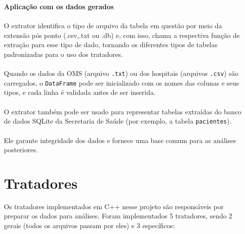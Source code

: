 \documentclass[a4paper,12pt]{article}
\begin{document}
\textbf{Aplicação com os dados gerados}
\\
\\
O extrator identifica o tipo de arquivo da tabela em questão por meio da extensão pós ponto (.csv,.txt ou .db) e, com isso, chama a respectiva função de extração para esse tipo de dado, tornando os diferentes tipos de tabelas padronizadas para o uso dos tratadores.\\
\\
Quando os dados da OMS (arquivo \texttt{.txt}) ou dos hospitais (arquivos \texttt{.csv}) são carregados, o \texttt{DataFrame} pode ser inicializado com os nomes das colunas e seus tipos, e cada linha é validada antes de ser inserida.
\\
\\
O extrator também pode ser usado para representar tabelas extraídas do banco de dados SQLite da Secretaria de Saúde (por exemplo, a tabela \texttt{pacientes}).
\\
\\
Ele garante integridade dos dados e fornece uma base comum para as análises posteriores.


\section{Tratadores}

Os tratadores implementados em C++ nesse projeto são responsáveis por preparar os dados para análises. Foram implementados 5 tratadores, sendo 2 gerais (todos os arquivos passam por eles) e 3 específicos:
\end{document}
